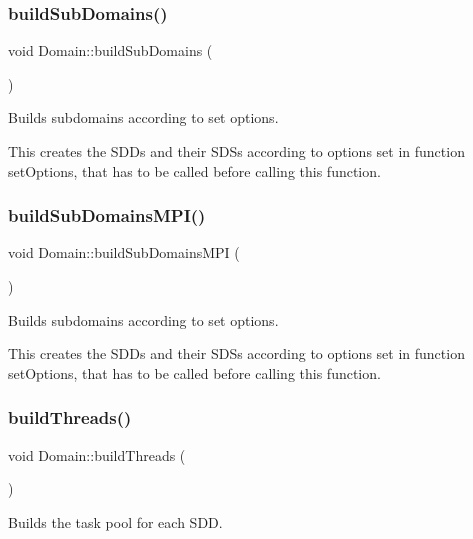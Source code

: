 \subsubsection{\texorpdfstring{build\+Sub\+Domains()}{buildSubDomains()}}
{\footnotesize\ttfamily void Domain\+::build\+Sub\+Domains (\begin{DoxyParamCaption}{ }\end{DoxyParamCaption})}



Builds subdomains according to set options. 

This creates the S\+D\+Ds and their S\+D\+Ss according to options set in function set\+Options, that has to be called before calling this function. \mbox{\label{classDomain_af1262b85d13fbbf90388e453d9602372}} 
\subsubsection{\texorpdfstring{build\+Sub\+Domains\+M\+P\+I()}{buildSubDomainsMPI()}}
{\footnotesize\ttfamily void Domain\+::build\+Sub\+Domains\+M\+PI (\begin{DoxyParamCaption}{ }\end{DoxyParamCaption})}



Builds subdomains according to set options. 

This creates the S\+D\+Ds and their S\+D\+Ss according to options set in function set\+Options, that has to be called before calling this function. \mbox{\label{classDomain_aa2e6cebf44a57323f3c6344d131126c1}} 
\subsubsection{\texorpdfstring{build\+Threads()}{buildThreads()}\hspace{0.1cm}{\footnotesize\ttfamily [1/2]}}
{\footnotesize\ttfamily void Domain\+::build\+Threads (\begin{DoxyParamCaption}{ }\end{DoxyParamCaption})}



Builds the task pool for each S\+DD. 

